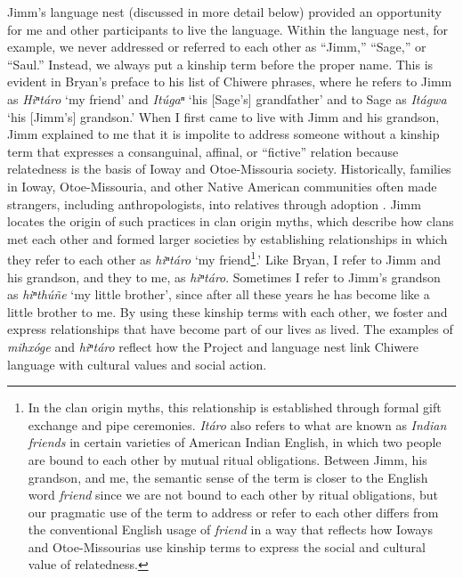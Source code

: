 \documentclass[output=paper]{LSP/langsci}
\begin{document}
Jimm's language nest (discussed in more detail below) provided an opportunity for me and other participants to live the language. Within the language nest, for example, we never addressed or referred to each other as ``Jimm,'' ``Sage,'' or ``Saul.'' Instead, we always put a kinship term before the proper name. This is evident in Bryan's preface to his list of Chiwere phrases, where he refers to Jimm as \emph{Hiⁿtáro} `my friend' and \emph{Itúgaⁿ} `his [Sage's] grandfather' and to Sage as \emph{Itágwa} `his [Jimm's] grandson.' When I first came to live with Jimm and his grandson, Jimm explained to me that it is impolite to address someone without a kinship term that expresses a consanguinal, affinal, or ``fictive'' relation because relatedness is the basis of Ioway and Otoe-Missouria society. Historically, families in Ioway, Otoe-Missouria, and other Native American communities often made strangers, including anthropologists, into relatives through adoption \citep[see e.g.][]{Kan2001}. Jimm locates the origin of such practices in clan origin myths, which describe how clans met each other and formed larger societies by establishing relationships in which they refer to each other as \emph{hiⁿtáro} `my friend\footnote{In the clan origin myths, this relationship is established through formal gift exchange and pipe ceremonies. \emph{Itáro} also refers to what are known as \emph{Indian friends} in certain varieties of American Indian English, in which two people are bound to each other by mutual ritual obligations. Between Jimm, his grandson, and me, the semantic sense of the term is closer to the English word \emph{friend} since we are not bound to each other by ritual obligations, but our pragmatic use of the term to address or refer to each other differs from the conventional English usage of \emph{friend} in a way that reflects how Ioways and Otoe-Missourias use kinship terms to express the social and cultural value of relatedness.}.' Like Bryan, I refer to Jimm and his grandson, and they to me, as \emph{hiⁿtáro}. Sometimes I refer to Jimm's grandson as \emph{hiⁿthúñe} `my little brother', since after all these years he has become like a little brother to me. By using these kinship terms with each other, we foster and express relationships that have become part of our lives as lived. The examples of \emph{mihxóge} and \emph{hiⁿtáro} reflect how the Project and language nest link Chiwere language with cultural values and social action.
\end{document}
